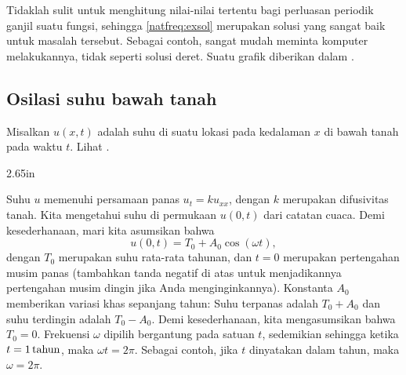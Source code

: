 \begin{example}
Tidaklah sulit untuk menghitung nilai-nilai tertentu
bagi perluasan periodik ganjil suatu fungsi, sehingga
\eqref{natfreq:exsol} merupakan solusi yang sangat baik untuk masalah tersebut.
Sebagai contoh, sangat mudah meminta komputer melakukannya, tidak seperti solusi deret.
Suatu grafik diberikan dalam .
\begin{myfig}
\capstart
{}
\caption{Grafik $y(x,t) = \frac{F(x+t) + F(x-t)}{2} + \left( \cos (x) -
\frac{\cos (1) - 1}{\sin (1)} \sin (x) -1 \right) \cos (t)$.%
\label{natfreq:forcedvibfig}}
\end{myfig}
\end{example}

\subsection{Osilasi suhu bawah tanah}

Misalkan $u(x,t)$ adalah suhu di suatu lokasi pada kedalaman $x$
di bawah tanah pada waktu $t$.  Lihat .

\begin{mywrapfig}{2.65in}
\capstart
{}
\caption{Suhu bawah tanah.\label{sps:groundtempfig}}
\end{mywrapfig}

Suhu $u$ memenuhi persamaan panas $u_t = ku_{xx}$, dengan $k$
merupakan difusivitas tanah.
Kita mengetahui suhu di permukaan $u(0,t)$ dari catatan
cuaca.  Demi kesederhanaan, mari kita asumsikan bahwa
\begin{equation*}
u(0,t) = T_0 + A_0 \cos (\omega t) ,
\end{equation*}
dengan $T_0$ merupakan suhu rata-rata
tahunan, dan
$t=0$ merupakan pertengahan musim panas (tambahkan
tanda negatif di atas untuk menjadikannya pertengahan musim dingin jika Anda menginginkannya).
Konstanta $A_0$ memberikan 
variasi khas sepanjang tahun:
Suhu terpanas adalah $T_0 + A_0$ dan suhu terdingin adalah $T_0 - A_0$.
Demi kesederhanaan, kita mengasumsikan bahwa $T_0 = 0$.
Frekuensi $\omega$ dipilih bergantung pada satuan $t$, sedemikian sehingga
ketika $t=\unit[1]{tahun}$, maka $\omega t = 2 \pi$.  Sebagai contoh, jika $t$
dinyatakan dalam tahun, maka $\omega = 2\pi$.

